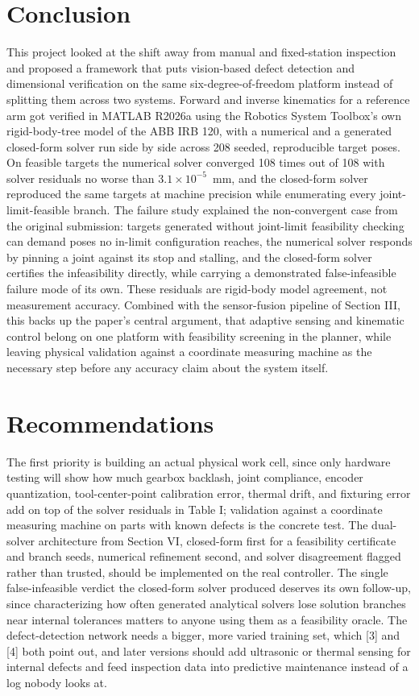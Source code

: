 \documentclass[conference]{IEEEtran}
\begin{document}
\section{Conclusion}
This project looked at the shift away from manual and fixed-station inspection and proposed a framework that puts vision-based defect detection and dimensional verification on the same six-degree-of-freedom platform instead of splitting them across two systems. Forward and inverse kinematics for a reference arm got verified in MATLAB R2026a using the Robotics System Toolbox's own rigid-body-tree model of the ABB IRB 120, with a numerical and a generated closed-form solver run side by side across 208 seeded, reproducible target poses. On feasible targets the numerical solver converged 108 times out of 108 with solver residuals no worse than $3.1\times10^{-5}$~mm, and the closed-form solver reproduced the same targets at machine precision while enumerating every joint-limit-feasible branch. The failure study explained the non-convergent case from the original submission: targets generated without joint-limit feasibility checking can demand poses no in-limit configuration reaches, the numerical solver responds by pinning a joint against its stop and stalling, and the closed-form solver certifies the infeasibility directly, while carrying a demonstrated false-infeasible failure mode of its own. These residuals are rigid-body model agreement, not measurement accuracy. Combined with the sensor-fusion pipeline of Section III, this backs up the paper's central argument, that adaptive sensing and kinematic control belong on one platform with feasibility screening in the planner, while leaving physical validation against a coordinate measuring machine as the necessary step before any accuracy claim about the system itself.

\section{Recommendations}
The first priority is building an actual physical work cell, since only hardware testing will show how much gearbox backlash, joint compliance, encoder quantization, tool-center-point calibration error, thermal drift, and fixturing error add on top of the solver residuals in Table I; validation against a coordinate measuring machine on parts with known defects is the concrete test. The dual-solver architecture from Section VI, closed-form first for a feasibility certificate and branch seeds, numerical refinement second, and solver disagreement flagged rather than trusted, should be implemented on the real controller. The single false-infeasible verdict the closed-form solver produced deserves its own follow-up, since characterizing how often generated analytical solvers lose solution branches near internal tolerances matters to anyone using them as a feasibility oracle. The defect-detection network needs a bigger, more varied training set, which {[}3{]} and {[}4{]} both point out, and later versions should add ultrasonic or thermal sensing for internal defects and feed inspection data into predictive maintenance instead of a log nobody looks at.
\end{document}
